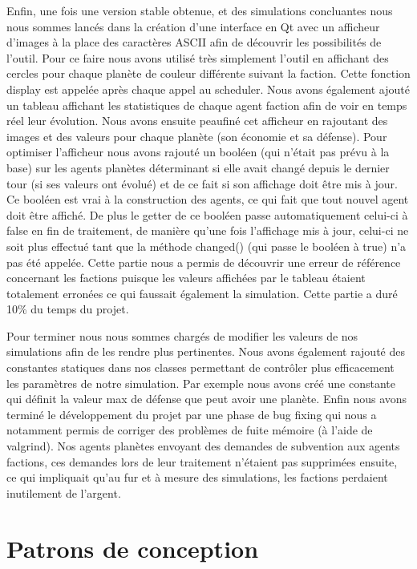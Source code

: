   Enfin, une fois une version stable obtenue, et des simulations concluantes nous nous sommes lancés dans la création d’une interface en Qt avec un afficheur d’images à la place des caractères ASCII afin de découvrir les possibilités de l’outil. Pour ce faire nous avons utilisé très simplement l’outil en affichant des cercles pour chaque planète de couleur différente suivant la faction. Cette fonction display est appelée après chaque appel au scheduler. Nous avons également ajouté un tableau affichant les statistiques de chaque agent faction afin de voir en temps réel leur évolution. Nous avons ensuite peaufiné cet afficheur en rajoutant des images et des valeurs pour chaque planète (son économie et sa défense). Pour optimiser l’afficheur nous avons rajouté un booléen (qui n’était pas prévu à la base) sur les agents planètes déterminant si elle avait changé depuis le dernier tour (si ses valeurs ont évolué) et de ce fait si son affichage doit être mis à jour. Ce booléen est vrai à la construction des agents, ce qui fait que tout nouvel agent doit être affiché. De plus le getter de ce booléen passe automatiquement celui-ci à false en fin de traitement, de manière qu’une fois l’affichage mis à jour, celui-ci ne soit plus effectué tant que la méthode changed() (qui passe le booléen à true) n’a pas été appelée. Cette partie nous a permis de découvrir une erreur de référence concernant les factions puisque les valeurs affichées par le tableau étaient totalement erronées ce qui faussait également la simulation. Cette partie a duré 10\% du temps du projet.

  Pour terminer nous nous sommes chargés de modifier les valeurs de nos simulations afin de les rendre plus pertinentes. Nous avons également rajouté des constantes statiques dans nos classes permettant de contrôler plus efficacement les paramètres de notre simulation. Par exemple nous avons créé une constante  qui définit la valeur max de défense que peut avoir une planète. Enfin nous avons terminé le développement du projet par une phase de bug fixing qui nous a notamment permis de corriger des problèmes de fuite mémoire (à l’aide de valgrind). Nos agents planètes envoyant des demandes de subvention aux agents factions, ces demandes lors de leur traitement n’étaient pas supprimées ensuite, ce qui impliquait qu’au fur et à mesure des simulations, les factions perdaient inutilement de l’argent.

  \section{Patrons de conception}

